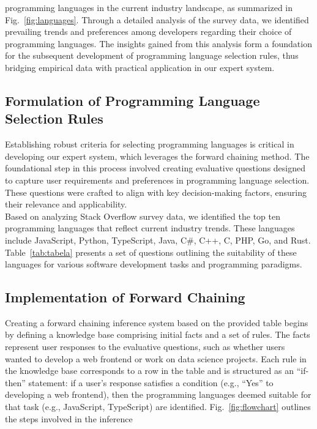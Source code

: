 \documentclass[conference]{IEEEtran}
\begin{document}
\noindent programming languages in the current industry landscape, as summarized in Fig.~\ref{fig:languages}. Through a detailed analysis of the survey data, we identified prevailing trends and preferences among developers regarding their choice of programming languages. The insights gained from this analysis form a foundation for the subsequent development of programming language selection rules, thus bridging empirical data with practical application in our expert system.
\subsection{Formulation of Programming Language Selection Rules}
\indent Establishing robust criteria for selecting programming languages is critical in developing our expert system, which leverages the forward chaining method. The foundational step in this process involved creating evaluative questions designed to capture user requirements and preferences in programming language selection. These questions were crafted to align with key decision-making factors, ensuring their relevance and applicability. \\
\indent Based on analyzing Stack Overflow survey data, we identified the top ten programming languages that reflect current industry trends. These languages include JavaScript, Python, TypeScript, Java, C\#, C++, C, PHP, Go, and Rust. Table~\ref{tab:tabela}
presents a set of questions outlining the suitability of these languages for various software development tasks and programming paradigms.
\subsection{Implementation of Forward Chaining}
Creating a forward chaining inference system based on the provided table begins by defining a knowledge base comprising initial facts and a set of rules. The facts represent user responses to the evaluative questions, such as whether users wanted to develop a web frontend or work on data science projects. Each rule in the knowledge base corresponds to a row in the table and is structured as an “if-then” statement: if a user’s response satisfies a condition (e.g., “Yes” to developing a web frontend), then the programming languages deemed suitable for that task (e.g., JavaScript, TypeScript) are identified. Fig.~\ref{fig:flowchart} outlines the steps involved in the inference
\end{document}
